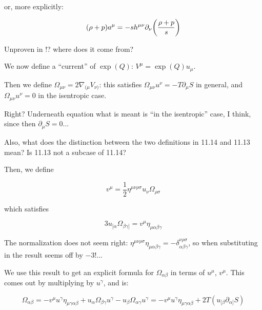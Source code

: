 \documentclass[main.tex]{subfiles}
\begin{document}
or, more explicitly:

\begin{equation}
  (\rho + p) a^\mu = -s h^{\mu\nu} \partial_\nu \qty(\frac{\rho + p}{s})
\end{equation}

\begin{greenbox}
  Unproven in \cite[]{Taub:1978}!? where does it come from?
\end{greenbox}

We now define a ``current'' of \(\exp(Q)\): \(V^\mu = \exp(Q) u_\mu \).

Then we define \(\Omega_{\mu\nu} = 2 \nabla_{(\mu} V_{\nu)}\): this satisfies \(\Omega_{\mu\nu} u^\nu = - T \partial_\mu S\) in general, and \(\Omega_{\mu\nu} u^\nu = 0\) in the isentropic case.

\begin{greenbox}
  Right? Underneath equation \cite[11.14]{Taub:1978} what is meant is ``in the isentropic'' case, I think, since then \(\partial_\mu S = 0\)...

  Also, what does the distinction between the two definitions in 11.14 and 11.13 mean? Is 11.13 not a subcase of 11.14?
\end{greenbox}

Then, we define

\begin{equation}
  v^\mu = \frac{1}{2} \eta^{\mu \nu \rho \sigma} u_\nu \Omega_{\rho \sigma}
\end{equation}

which satisfies

\begin{equation}
  3 u_{[\alpha} \Omega_{\beta \gamma]} = v^{\mu} \eta_{\mu \alpha \beta \gamma}
\end{equation}

\begin{greenbox}
  The normalization does not seem right: \(\eta^{\mu\nu\rho\sigma} \eta_{\mu\alpha\beta\gamma} = -\delta^{\nu\rho\sigma}_{\alpha\beta\gamma}\), so when substituting in the result seems off by \(- 3!\)...
\end{greenbox}

We use this result to get an explicit formula for \(\Omega_{\alpha\beta}\) in terms of \(u^\mu\), \(v^\mu\).
This comes out by multiplying by \(u^\gamma\), and is:

\begin{equation}
  \Omega _{\alpha\beta}
  = - v^\mu u^\gamma \eta_{\mu\gamma\alpha\beta} + u_\alpha \Omega_{\beta\gamma} u^\gamma - u_\beta \Omega_{\alpha\gamma} u^\gamma
  = - v^\mu u^\gamma \eta_{\mu\gamma\alpha\beta} + 2T (u_{[\beta} \partial_{\alpha]} S )
\end{equation}
\end{document}
